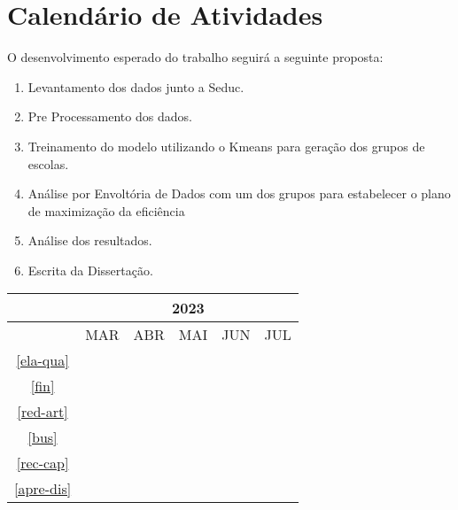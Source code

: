 \chapter{Calendário de Atividades}
\label{ch:calendario-de-atividades}

O desenvolvimento esperado do trabalho seguirá a seguinte proposta:

\begin{enumerate}
	\item \label{ela-qua} Levantamento dos dados junto a Seduc.
	\item \label{fin} Pre Processamento dos dados.
	\item \label{red-art} Treinamento do modelo utilizando o Kmeans para geração dos grupos de escolas.
	\item \label{bus} Análise por Envoltória de Dados com um dos grupos para estabelecer o plano de maximização da eficiência 
	\item \label{rec-cap} Análise dos resultados.
	\item \label{apre-dis} Escrita da Dissertação.
\end{enumerate}

\begin{table}[htbp]
	\centering
		\begin{tabular}{|c|c|c|c|c|c|}
		\hline
		&\multicolumn{5}{c|}{2023}\\
		\hline
		&MAR&ABR&MAI&JUN&JUL\\
		\hline
		\ref{ela-qua}&\cellcolor{midgray}&\cellcolor{midgray}&&&\\
		\hline
		\ref{fin}&&\cellcolor{midgray}&\cellcolor{midgray}&&\\
		\hline	
		\ref{red-art}&&\cellcolor{midgray}&\cellcolor{midgray}&&\\
		\hline			
		\ref{bus}&&&\cellcolor{midgray}&\cellcolor{midgray}&\\
		\hline
		\ref{rec-cap}&&&&\cellcolor{midgray}&\cellcolor{midgray}\\
		\hline	
		\ref{apre-dis}&&&&&\cellcolor{midgray}\\
		\hline	
		\end{tabular}
\end{table}
